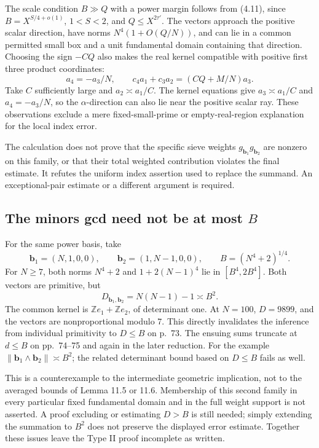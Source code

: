 \documentclass[10pt]{article}
\begin{document}
The scale condition \(B\gg Q\) with a power margin follows from (4.11), since \(B=X^{S/4+o(1)}\), \(1<S<2\), and \(Q\le X^{2\tau'}\). The vectors approach the positive scalar direction, have norms \(N^4(1+O(Q/N))\), and can lie in a common permitted small box and a unit fundamental domain containing that direction. Choosing the sign \(-CQ\) also makes the real kernel compatible with positive first three product coordinates: \[a_4=-a_3/N,\qquad c_4a_1+c_3a_2=(CQ+M/N)a_3.\] Take \(C\) sufficiently large and \(a_2\asymp a_1/C\). The kernel equations give \(a_3\asymp a_1/C\) and \(a_4=-a_3/N\), so the \(\alpha\)-direction can also lie near the positive scalar ray. These observations exclude a mere fixed-small-prime or empty-real-region explanation for the local index error.\par
The calculation does not prove that the specific sieve weights \(g_{\mathbf b_1}g_{\mathbf b_2}\) are nonzero on this family, or that their total weighted contribution violates the final estimate. It refutes the uniform index assertion used to replace the summand. An exceptional-pair estimate or a different argument is required.\par
\subsection*{The minors gcd need not be at most \(B\)}
For the same power basis, take \[\mathbf b_1=(N,1,0,0),\qquad \mathbf b_2=(1,N-1,0,0),\qquad
 B=(N^4+2)^{1/4}.\] For \(N\ge7\), both norms \(N^4+2\) and \(1+2(N-1)^4\) lie in \([B^4,2B^4]\). Both vectors are primitive, but \[D_{\mathbf b_1,\mathbf b_2}=N(N-1)-1\asymp B^2.\] The common kernel is \(\mathbb Ze_1+\mathbb Ze_2\), of determinant one. At \(N=100\), \(D=9899\), and the vectors are nonproportional modulo 7. This directly invalidates the inference from individual primitivity to \(D\le B\) on p. 73. The ensuing sums truncate at \(d\le B\) on pp. 74–75 and again in the later reduction. For the example \(\|\mathbf b_1\wedge\mathbf b_2\|\asymp B^2\); the related determinant bound based on \(D\le B\) fails as well.\par
This is a counterexample to the intermediate geometric implication, not to the averaged bounds of Lemma 11.5 or 11.6. Membership of this second family in every particular fixed fundamental domain and in the full weight support is not asserted. A proof excluding or estimating \(D>B\) is still needed; simply extending the summation to \(B^2\) does not preserve the displayed error estimate. Together these issues leave the Type II proof incomplete as written.\par
\end{document}
